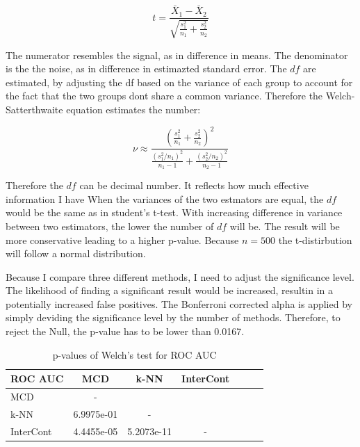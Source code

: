 \begin{equation}
    t = \frac{\bar{X}_1 - \bar{X}_2}{\sqrt{\frac{s_1^2}{n_1} + \frac{s_2^2}{n_2}}}
\end{equation}

The numerator resembles the signal, as in difference in means.
The denominator is the the noise, as in difference in estimazted standard error.
The $df$ are estimated, by adjusting the df based on the variance of each group to account for the fact that the two groups dont share a common variance.
Therefore the Welch-Satterthwaite equation estimates the number:

\begin{equation}
    \nu \approx \frac{\left( \frac{s_1^2}{n_1} + \frac{s_2^2}{n_2} \right)^2}{\frac{(s_1^2 / n_1)^2}{n_1 - 1} + \frac{(s_2^2 / n_2)^2}{n_2 - 1}}
\end{equation}

Therefore the $df$ can be decimal number.
It reflects how much effective information I have 
When the variances of the two estmators are equal, the $df$ would be the same as in student's t-test.
With increasing difference in variance between two estimators, the lower the number of $df$ will be.
The result will be more conservative leading to a higher p-value.
Because $n=500$ the t-distirbution will follow a normal distribution.

Because I compare three different methods, I need to adjust the significance level.
The likelihood of finding a significant result would be increased, resultin in a potentially increased false positives. 
The Bonferroni corrected alpha is applied by simply deviding the significance level by the number of methods.
Therefore, to reject the Null, the p-value has to be lower than 0.0167. 


\begin{table}[h]
\centering
\caption{p-values of Welch's test for ROC AUC}
\label{tab:Welch1}
\begin{tabular}{lcccccc} 
\toprule
\textbf{ROC AUC}    & MCD       & k-NN      & InterCont  &    \\
\midrule
MCD                 & -             &               &    &     \\
k-NN                & 6.9975e-01    & -             &    &     \\
InterCont           & 4.4455e-05    & 5.2073e-11    & -  &     \\
\bottomrule
\end{tabular}
\end{table}


